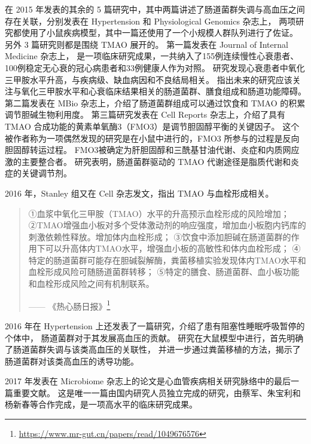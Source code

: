\documentclass[]{ctexbook}
\renewcommand{\href}[2]{#2\footnote{\url{#1}}}
\begin{document}
在 2015 年发表的其余的 5 篇研究中，其中两篇讲述了肠道菌群失调与高血压之间存在关联\citep[\citet{yangtaoGutDysbiosisLinked2015}]{mellEvidenceLinkGut2015}，分别发表在 Hypertension 和 Physiological Genomics 杂志上，
两项研究都使用了小鼠疾病模型，其中一篇还使用了一个小规模人群队列进行了佐证。
另外 3 篇研究则都是围绕 TMAO 展开的。
第一篇发表在 Journal of Internal Medicine 杂志上\citep{troseidMicrobiotadependentMetaboliteTrimethylamineNoxide2015}，
是一项临床研究成果，一共纳入了155例连续慢性心衰患者、100例稳定无心衰的冠心病患者和33例健康人作为对照。
研究发现心衰患者中氧化三甲胺水平升高，与疾病级、缺血病因和不良结局相关。
指出未来的研究应该关注与氧化三甲胺水平和心衰临床结果相关的肠道菌群、膳食组成和肠道功能障碍。
第二篇发表在 MBio 杂志上，介绍了肠道菌群组成可以通过饮食和 TMAO 的积累调节胆碱生物利用度\citep{romanoIntestinalMicrobiotaComposition2015}。
第三篇研究发表在 Cell Reports 杂志上，介绍了具有 TMAO 合成功能的黄素单氧酶3（FMO3）是调节胆固醇平衡的关键因子\citep{warrierTMAOGeneratingEnzymeFlavin2015}。
这个被作者称为一项偶然发现的研究是在小鼠中进行的，FMO3 所参与的过程是反向胆固醇转运过程。
FMO3被确定为肝胆固醇和三酰基甘油代谢、炎症和内质网应激的主要整合者。
研究表明，肠道菌群驱动的 TMAO 代谢途径是脂质代谢和炎症的关键调节剂。

2016 年，Stanley 组又在 Cell 杂志发文，指出 TMAO 与血栓形成相关\citep{zhuGutMicrobialMetabolite2016}。

\begin{quote}
①血浆中氧化三甲胺（TMAO）水平的升高预示血栓形成的风险增加；
②TMAO增强血小板对多个受体激动剂的响应强度，增加血小板胞内钙库的刺激依赖性释放。增加体内血栓形成；
③饮食中添加胆碱在肠道菌群的作用下可以升高体内TMAO水平，增强血小板的高敏性和体内血栓形成；
④特定的肠道菌群可能存在胆碱裂解酶，粪菌移植实验发现体内TMAO水平和血栓形成风险可随肠道菌群转移；
⑤特定的膳食、肠道菌群、血小板功能和血栓形成风险之间有机制联系。
\begin{flushright}------ \href{https://www.mr-gut.cn/papers/read/1049676576}{《热心肠日报》}\end{flushright}
\end{quote}

2016 年在 Hypertension 上还发表了一篇研究，介绍了患有阻塞性睡眠呼吸暂停的个体中，
肠道菌群对于其发展高血压的贡献\citep{durgandavidj.RoleGutMicrobiome2016}。
研究在大鼠模型中进行，首先明确了肠道菌群失调与该类高血压的关联性，
并进一步通过粪菌移植的方法，揭示了肠道菌群对该类高血压的诱导功能。

2017 年发表在 Microbiome 杂志上的论文是心血管疾病相关研究脉络中的最后一篇重要文献。
这是唯一一篇由国内研究人员独立完成的研究，由蔡军、朱宝利和杨新春等合作完成，是一项高水平的临床研究成果。
\end{document}
